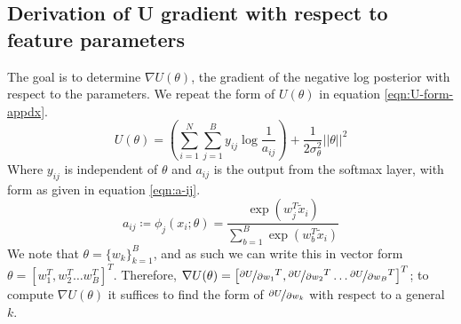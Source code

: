 \subsection{Derivation of U gradient with respect to feature parameters}
\label{appdx:gradu}
The goal is to determine $\nabla U(\theta)$, the gradient of the negative log posterior with respect to the parameters. We repeat the form of $U(\theta)$ in equation \ref{eqn:U-form-appdx}.
%
\begin{equation}
	U(\theta) = \left( \sum_{i=1}^{N} \sum_{j=1}^{B} y_{ij} \log \frac{1}{a_{ij}} \right)
	+ \frac{1}{2\sigma_\theta^2} ||\theta||^2
	\label{eqn:U-form-appdx}
\end{equation}
%
Where $y_{ij}$ is independent of $\theta$ and $a_{ij}$ is the output from the softmax layer, with form as given in equation \ref{eqn:a-ij}.
%
\begin{equation}
	a_{ij} \coloneqq \phi_{j} (x_i; \theta) = \frac{\exp(w_j^T \tilde{x}_i)}{\sum_{b=1}^{B} \exp(w_b^T \tilde{x}_i)}
	\label{eqn:a-ij} 
\end{equation}
%
We note that $\theta = \{w_k\}_{k=1}^B$, and as such we can write this in vector form $\theta = \left[w_1^T, w_2^T \dots w_B^T  \right]^T$. Therefore, $\nabla U(\theta) = \left[\nicefrac{\partial U}{\partial w_1}^T,\nicefrac{\partial U}{\partial w_2}^T \dots \nicefrac{\partial U}{\partial w_B}^T  \right]^T$; to compute $\nabla U(\theta)$ it suffices to find the form of $\nicefrac{\partial U}{\partial w_k}$ with respect to a general $k$.

